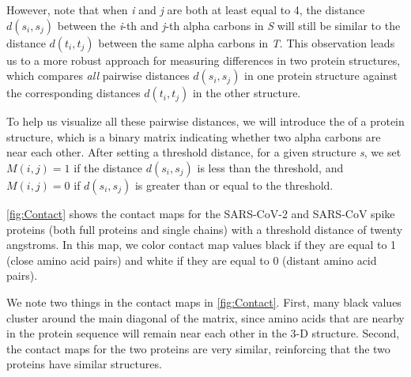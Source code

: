 However, note that when \textit{i} and \textit{j} are both at least equal to 4, the distance $d(s_{i}, s_{j})$ between the \textit{i}-th and \textit{j}-th alpha carbons in \textit{S} will still be similar to the distance $d(t_{i}, t_{j})$ between the same alpha carbons in \textit{T}. This observation leads us to a more robust approach for measuring differences in two protein structures, which compares \textit{all} pairwise distances $d(s_{i}, s_{j})$ in one protein structure against the corresponding distances $d(t_{i}, t_{j})$ in the other structure.

To help us visualize all these pairwise distances, we will introduce the  of a protein structure, which is a binary matrix indicating whether two alpha carbons are near each other. After setting a threshold distance, for a given structure \textit{s}, we set $M(i, j) = 1$ if the distance $d(s_{i}, s_{j})$ is less than the threshold, and $M(i, j) = 0$ if $d(s_{i}, s_{j})$ is greater than or equal to the threshold.

\autoref{fig:Contact} shows the contact maps for the SARS-CoV-2 and SARS-CoV spike proteins (both full proteins and single chains) with a threshold distance of twenty angstroms. In this map, we color contact map values black if they are equal to 1 (close amino acid pairs) and white if they are equal to 0 (distant amino acid pairs).

We note two things in the contact maps in \autoref{fig:Contact}. First, many black values cluster around the main diagonal of the matrix, since amino acids that are nearby in the protein sequence will remain near each other in the 3-D structure. Second, the contact maps for the two proteins are very similar, reinforcing that the two proteins have similar structures.\\

\begin{note}\end{note}

